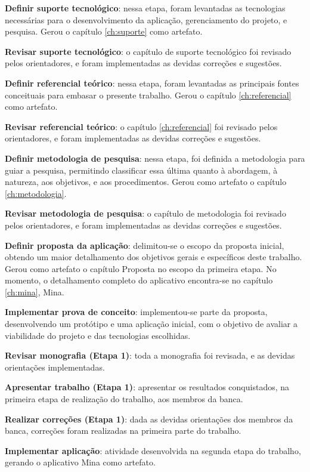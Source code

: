 \textbf{Definir suporte tecnológico}: nessa etapa, foram levantadas as tecnologias necessárias para o desenvolvimento da 
aplicação, gerenciamento do projeto, e pesquisa. Gerou o capítulo \ref{ch:suporte} como artefato.

\textbf{Revisar suporte tecnológico}: o capítulo de suporte tecnológico foi revisado pelos orientadores, e foram implementadas as devidas correções e sugestões.

\textbf{Definir referencial teórico}: nessa etapa, foram levantadas as principais fontes conceituais para embasar o presente trabalho. Gerou o capítulo \ref{ch:referencial} como artefato.

\textbf{Revisar referencial teórico}: o capítulo \ref{ch:referencial} foi revisado pelos orientadores, e foram implementadas as devidas correções e sugestões.

\textbf{Definir metodologia de pesquisa}: nessa etapa, foi definida a metodologia 
para guiar a pesquisa, permitindo classificar essa última quanto
à abordagem, à natureza, aos objetivos, e aos procedimentos. Gerou como artefato o capítulo \ref{ch:metodologia}.

\textbf{Revisar metodologia de pesquisa}: o capítulo de metodologia foi revisado pelos orientadores, e foram implementadas as devidas correções e sugestões.

\textbf{Definir proposta da aplicação}: delimitou-se o escopo da proposta inicial, obtendo um maior detalhamento 
dos objetivos gerais e específicos deste trabalho. Gerou como artefato o capítulo Proposta no 
escopo da primeira etapa. No momento, o detalhamento completo do aplicativo encontra-se no capítulo \ref{ch:mina}, Mina.

\textbf{Implementar prova de conceito}: implementou-se parte da proposta, desenvolvendo um protótipo e uma aplicação inicial, com o objetivo 
de avaliar a viabilidade do projeto e das tecnologias escolhidas.

\textbf{Revisar monografia (Etapa 1)}: toda a monografia foi revisada, e as devidas orientações implementadas.
 
\textbf{Apresentar trabalho (Etapa 1)}: apresentar os resultados conquistados, na primeira etapa 
de realização do trabalho, aos membros da banca.

\textbf{Realizar correções (Etapa 1)}: dada as devidas orientações dos membros da banca, correções 
foram realizadas na primeira parte do trabalho.

\textbf{Implementar aplicação}: atividade desenvolvida na segunda etapa do trabalho, 
gerando o aplicativo Mina como artefato.

